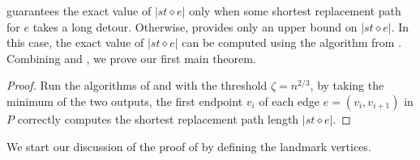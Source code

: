  guarantees the exact value of $|st \diamond e|$ only when some shortest replacement path for $e$ takes a long detour. Otherwise,  provides only an upper bound on $|st \diamond e|$. In this case, the exact value of $|st \diamond e|$ can be computed using the algorithm from . Combining  and , we prove our first main theorem.

\mainUB*

\begin{proof}
Run the algorithms of  and  with the threshold $\zeta = n^{2/3}$, by taking the minimum of the two outputs, the first endpoint $v_i$ of each edge $e=(v_i, v_{i+1})$ in $P$ correctly computes the shortest replacement path length $|st \diamond e|$.
\end{proof}






We start our discussion of the proof of  by defining the landmark vertices. %

